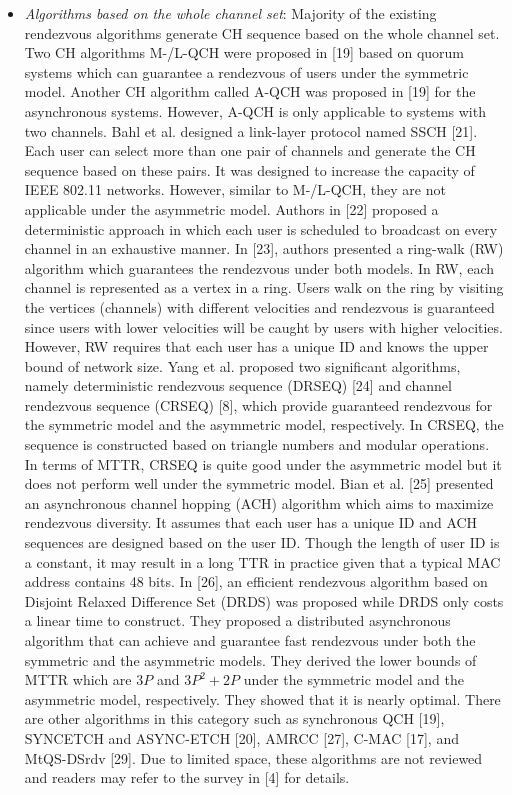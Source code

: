 \documentclass[journal]{IEEEtran}
\begin{document}
\begin{itemize}
    \item\emph{Algorithms based on the whole channel set}: Majority of the existing rendezvous algorithms generate CH sequence based on the whole channel set. Two CH algorithms M-/L-QCH were proposed in [19] based on quorum systems which can guarantee a rendezvous of users under the symmetric model. Another CH algorithm called A-QCH was proposed in [19] for the asynchronous systems. However, A-QCH is only applicable to systems with two channels. Bahl et al. designed a link-layer protocol named SSCH [21]. Each user can select more than one pair of channels and generate the CH sequence based on these pairs. It was designed to increase the capacity of IEEE 802.11 networks. However, similar to M-/L-QCH, they are not applicable under the asymmetric model. Authors in [22] proposed a deterministic approach in which each user is scheduled to broadcast on every channel in an exhaustive manner. In [23], authors presented a ring-walk (RW) algorithm which guarantees the rendezvous under both models. In RW, each channel is represented as a vertex in a ring. Users walk on the ring by visiting the vertices (channels) with different velocities and rendezvous is guaranteed since users with lower velocities will be caught by users with higher velocities. However, RW requires that each user has a unique ID and knows the upper bound of network size. Yang et al. proposed two significant algorithms, namely deterministic rendezvous sequence (DRSEQ) [24] and channel rendezvous sequence (CRSEQ) [8], which provide guaranteed rendezvous for the symmetric model and the asymmetric model, respectively. In CRSEQ, the sequence is constructed based on triangle numbers and modular operations. In terms of MTTR, CRSEQ is quite good under the asymmetric model but it does not perform well under the symmetric model. Bian et al. [25] presented an asynchronous channel hopping (ACH) algorithm which aims to maximize rendezvous diversity. It assumes that each user has a unique ID and ACH sequences are designed based on the user ID. Though the length of user ID is a constant, it may result in a long TTR in practice given that a typical MAC address contains 48 bits. In [26], an efficient rendezvous algorithm based on Disjoint Relaxed Difference Set (DRDS) was proposed while DRDS only costs a linear time to construct. They proposed a distributed asynchronous algorithm that can achieve and guarantee fast rendezvous under both the symmetric and the asymmetric models. They derived the lower bounds of MTTR which are $3P$ and $3P^2+2P$ under the symmetric model and the asymmetric model, respectively. They showed that it is nearly optimal. There are other algorithms in this category such as synchronous QCH [19], SYNCETCH and ASYNC-ETCH [20], AMRCC [27], C-MAC [17], and MtQS-DSrdv [29]. Due to limited space, these algorithms are not reviewed and readers may refer to the survey in [4] for details.

\end{itemize}
\end{document}
